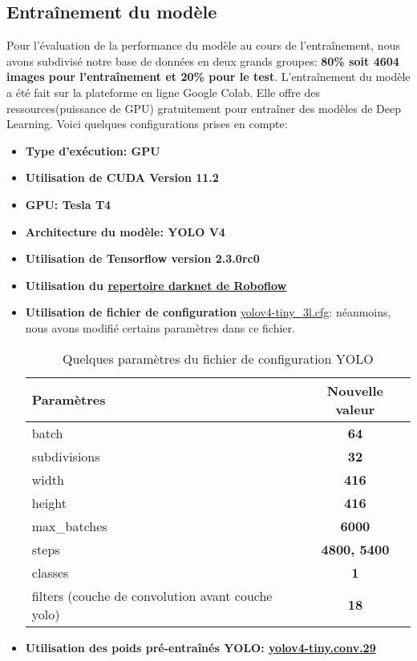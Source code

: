     \subsection{Entraînement du modèle}
    Pour l’évaluation de la performance du modèle au cours de l’entraînement, nous avons subdivisé notre base de données en deux grands groupes: \textbf{80\% soit 4604 images pour l’entraînement et 20\% pour le test}. L’entraînement du modèle a été fait sur la plateforme en ligne Google Colab. Elle offre des ressources(puissance de GPU) gratuitement pour entraîner des modèles de Deep Learning. Voici quelques configurations prises en compte:
    \begin{itemize}
        \item \textbf{Type d'exécution: GPU}
        \item \textbf{Utilisation de CUDA Version 11.2}
        \item \textbf{GPU: Tesla T4}
        \item \textbf{Architecture du modèle: YOLO V4}
        \item \textbf{Utilisation de Tensorflow version 2.3.0rc0}
        \item \textbf{Utilisation du \href{https://github.com/roboflow-ai/darknet.git}{repertoire darknet de Roboflow}}
        \item \textbf{Utilisation de fichier de configuration} \href{https://github.com/AlexeyAB/darknet/blob/master/cfg/yolov4-tiny-3l.cfg}{yolov4-tiny\_3l.cfg}: néanmoins, nous avons modifié certains paramètres dans ce fichier.
        \begin{table}[H]
            \centering
            \begin{tabular}{|l|c|}
                \hline
                \rowcolor{Gray}
                \textbf{Paramètres} & \textbf{Nouvelle valeur} \\ \hline
                batch & \textbf{64} \\ \hline
                subdivisions & \textbf{32} \\ \hline
                width & \textbf{416} \\ \hline
                height & \textbf{416} \\ \hline
                max\_batches & \textbf{6000} \\ \hline
                steps & \textbf{4800, 5400} \\ \hline
                classes & \textbf{1} \\ \hline
                filters (couche de convolution avant couche yolo) & \textbf{18} \\ \hline 
            \end{tabular}
            \caption{Quelques paramètres du fichier de configuration YOLO}
        \end{table}
        \item \textbf{Utilisation des poids pré-entraînés YOLO: \href{https://github.com/AlexeyAB/darknet/releases/download/darknet_yolo_v4_pre/yolov4-tiny.conv.29}{yolov4-tiny.conv.29}} 
    \end{itemize}
